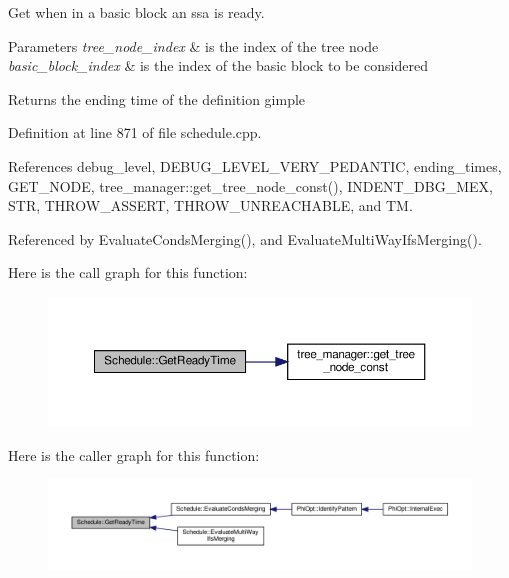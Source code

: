 Get when in a basic block an ssa is ready. 


\begin{DoxyParams}{Parameters}
{\em tree\+\_\+node\+\_\+index} & is the index of the tree node \\
\hline
{\em basic\+\_\+block\+\_\+index} & is the index of the basic block to be considered \\
\hline
\end{DoxyParams}
\begin{DoxyReturn}{Returns}
the ending time of the definition gimple 
\end{DoxyReturn}


Definition at line 871 of file schedule.\+cpp.



References debug\+\_\+level, D\+E\+B\+U\+G\+\_\+\+L\+E\+V\+E\+L\+\_\+\+V\+E\+R\+Y\+\_\+\+P\+E\+D\+A\+N\+T\+IC, ending\+\_\+times, G\+E\+T\+\_\+\+N\+O\+DE, tree\+\_\+manager\+::get\+\_\+tree\+\_\+node\+\_\+const(), I\+N\+D\+E\+N\+T\+\_\+\+D\+B\+G\+\_\+\+M\+EX, S\+TR, T\+H\+R\+O\+W\+\_\+\+A\+S\+S\+E\+RT, T\+H\+R\+O\+W\+\_\+\+U\+N\+R\+E\+A\+C\+H\+A\+B\+LE, and TM.



Referenced by Evaluate\+Conds\+Merging(), and Evaluate\+Multi\+Way\+Ifs\+Merging().

Here is the call graph for this function\+:
\nopagebreak
\begin{figure}[H]
\begin{center}
\leavevmode
\includegraphics[width=350pt]{df/d61/classSchedule_a8d72a4f687d2af4a664f711c7c192c0e_cgraph}
\end{center}
\end{figure}
Here is the caller graph for this function\+:
\nopagebreak
\begin{figure}[H]
\begin{center}
\leavevmode
\includegraphics[width=350pt]{df/d61/classSchedule_a8d72a4f687d2af4a664f711c7c192c0e_icgraph}
\end{center}
\end{figure}
\mbox{\label{classSchedule_ac2e233f2734b8d91805a4a51e3bd3246}} 
